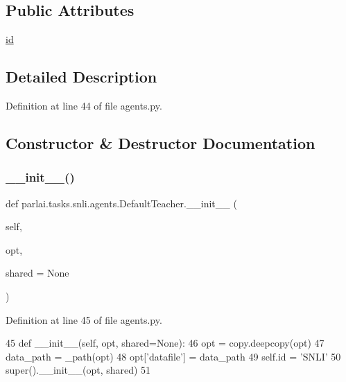 \subsection*{Public Attributes}
\begin{DoxyCompactItemize}
\item 
\hyperlink{classparlai_1_1tasks_1_1snli_1_1agents_1_1DefaultTeacher_a53a712ad89d4c98e7501d2b307a6481c}{id}
\end{DoxyCompactItemize}


\subsection{Detailed Description}


Definition at line 44 of file agents.\+py.



\subsection{Constructor \& Destructor Documentation}
\mbox{\label{classparlai_1_1tasks_1_1snli_1_1agents_1_1DefaultTeacher_a3712a548a459c659c30d811979bf07f0}} 
\subsubsection{\texorpdfstring{\+\_\+\+\_\+init\+\_\+\+\_\+()}{\_\_init\_\_()}}
{\footnotesize\ttfamily def parlai.\+tasks.\+snli.\+agents.\+Default\+Teacher.\+\_\+\+\_\+init\+\_\+\+\_\+ (\begin{DoxyParamCaption}\item[{}]{self,  }\item[{}]{opt,  }\item[{}]{shared = {\ttfamily None} }\end{DoxyParamCaption})}



Definition at line 45 of file agents.\+py.


\begin{DoxyCode}
45     \textcolor{keyword}{def }\_\_init\_\_(self, opt, shared=None):
46         opt = copy.deepcopy(opt)
47         data\_path = \_path(opt)
48         opt[\textcolor{stringliteral}{'datafile'}] = data\_path
49         self.id = \textcolor{stringliteral}{'SNLI'}
50         super().\_\_init\_\_(opt, shared)
51 
\end{DoxyCode}


